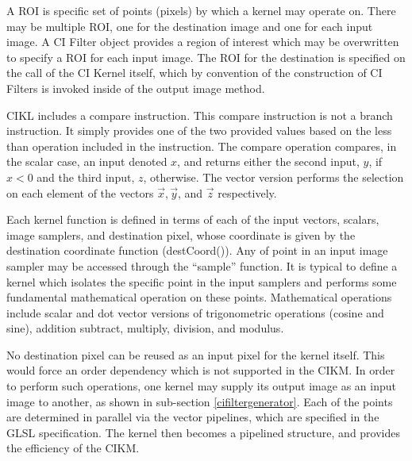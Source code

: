 \documentclass[11pt]{article}
\begin{document}
A ROI is specific set of points (pixels) by which a kernel may operate on.  There may be multiple ROI, one for the destination image and one for each input image.   A CI Filter object provides a region of interest which may be overwritten to specify a ROI for each input image.  The ROI for the destination is specified on the call of the CI Kernel itself, which by convention of the construction of CI Filters is invoked inside of the output image method.  

CIKL includes a compare instruction.  This compare instruction is not a branch instruction.  It simply provides one of the two provided values based on the less than operation included in the instruction. The compare operation compares, in the scalar case,  an input denoted $x$, and returns either the second input, $y$, if $x < 0$ and the third input, $z$, otherwise.  The vector version performs the selection on each element of the vectors $\vec{x}, \vec{y}$, and $\vec{z}$ respectively.

Each kernel function is defined in terms of each of the input vectors, scalars, image samplers, and  destination pixel, whose coordinate is given by the destination coordinate function (destCoord()).  Any of point in an input image sampler may be accessed through the ``sample'' function.  It is typical to define a kernel which isolates the specific point in the input samplers and performs some fundamental mathematical operation on these points.  Mathematical operations include scalar and dot vector versions of  trigonometric operations (cosine and sine), addition  subtract, multiply, division, and modulus.    

No destination pixel can be reused as an input pixel for the kernel itself.  This would force an order dependency which is not supported in the CIKM.  In order to perform such operations, one kernel may supply its output image as an input image to another, as shown in sub-section \ref{cifiltergenerator}. Each of the points are determined in parallel via the vector pipelines, which are specified in the GLSL specification.  The kernel then becomes a pipelined structure, and provides the efficiency of the CIKM.  
\end{document}
